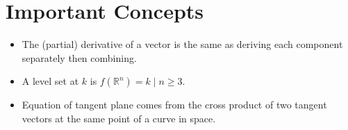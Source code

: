 \documentclass[11pt]{article}
\begin{document}
\section*{Important Concepts}
	\begin{itemize}
		\item The (partial) derivative of a vector is the same as deriving each component separately then combining.
		\item A level set at $k$  is $f(\mathbb{R}^n) = k \mid n\geq 3$.
		\item Equation of tangent plane comes from the cross product of two tangent vectors at the same point of a curve in space.
	\end{itemize}
%		
%		


\end{document}

